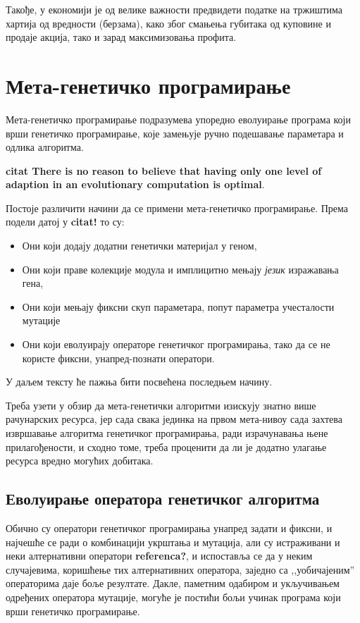 \documentclass[a4paper]{article}
\begin{document}
Такође, у економији је од велике важности предвидети податке на тржиштима хартија од вредности (берзама), како због смањења губитака од куповине и продаје акција, тако и зарад максимизовања профита. \cite{stock}

\section{Мета-генетичко програмирање}

Мета-генетичко програмирање подразумева упоредно еволуирање програма који врши генетичко програмирање, које замењује ручно подешавање параметара и одлика алгоритма.
\linebreak

\textbf{citat There is no reason to believe that having only one level of adaption in an evolutionary computation is optimal}.

Постоје различити начини да се примени мета-генетичко програмирање. Према подели датој у \textbf{citat!} то су:

\begin{itemize}
	\item Они који додају додатни генетички материјал у геном,
	\item Они који праве колекције модула и имплицитно мењају \emph{језик} изражавања гена,
	\item Они који мењају фиксни скуп параметара, попут параметра учесталости мутације
	\item Они који еволуирају операторе генетичког програмирања, тако да се не користе фиксни, унапред-познати оператори.
\end{itemize}

У даљем тексту ће пажња бити посвећена последњем начину.
\linebreak

Треба узети у обзир да мета-генетички алгоритми изискују знатно више рачунарских ресурса, јер сада свака јединка на првом мета-нивоу сада захтева извршавање алгоритма генетичког програмирања, ради израчунавања њене прилагођености, и сходно томе, треба проценити да ли је додатно улагање ресурса вредно могућих добитака.

\subsection{Еволуирање оператора генетичког алгоритма}

Обично су оператори генетичког програмирања унапред задати и фиксни, и најчешће се ради о комбинацији укрштања и мутација, али су истраживани и неки алтернативни оператори \textbf{referenca?}, и испоставља се да у неким случајевима, коришћење тих алтернативних оператора, заједно са ,,уобичајеним'' операторима даје боље резултате. Дакле, паметним одабиром и укључивањем одређених оператора мутације, могуће је постићи бољи учинак програма који врши генетичко програмирање.
\newline
\end{document}
